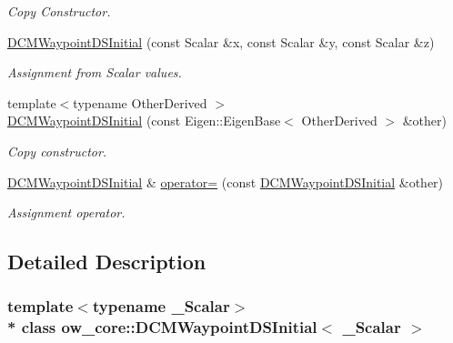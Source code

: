 \begin{DoxyCompactItemize}
\begin{DoxyCompactList}\small\item\em Copy Constructor. \end{DoxyCompactList}\item 
\hyperlink{classow__core_1_1DCMWaypointDSInitial_a5b2f311322420a5dd4dbcc60a7212f16}{D\+C\+M\+Waypoint\+D\+S\+Initial} (const Scalar \&x, const Scalar \&y, const Scalar \&z)\hypertarget{classow__core_1_1DCMWaypointDSInitial_a5b2f311322420a5dd4dbcc60a7212f16}{}\label{classow__core_1_1DCMWaypointDSInitial_a5b2f311322420a5dd4dbcc60a7212f16}

\begin{DoxyCompactList}\small\item\em Assignment from Scalar values. \end{DoxyCompactList}\item 
{\footnotesize template$<$typename Other\+Derived $>$ }\\\hyperlink{classow__core_1_1DCMWaypointDSInitial_a6097d0297b5a6a36bf34e053fc32567a}{D\+C\+M\+Waypoint\+D\+S\+Initial} (const Eigen\+::\+Eigen\+Base$<$ Other\+Derived $>$ \&other)
\begin{DoxyCompactList}\small\item\em Copy constructor. \end{DoxyCompactList}\item 
\hyperlink{classow__core_1_1DCMWaypointDSInitial}{D\+C\+M\+Waypoint\+D\+S\+Initial} \& \hyperlink{classow__core_1_1DCMWaypointDSInitial_a0e5bd8204fdeecf0227e1033b44550b3}{operator=} (const \hyperlink{classow__core_1_1DCMWaypointDSInitial}{D\+C\+M\+Waypoint\+D\+S\+Initial} \&other)\hypertarget{classow__core_1_1DCMWaypointDSInitial_a0e5bd8204fdeecf0227e1033b44550b3}{}\label{classow__core_1_1DCMWaypointDSInitial_a0e5bd8204fdeecf0227e1033b44550b3}

\begin{DoxyCompactList}\small\item\em Assignment operator. \end{DoxyCompactList}\end{DoxyCompactItemize}


\subsection{Detailed Description}
\subsubsection*{template$<$typename \+\_\+\+Scalar$>$\\*
class ow\+\_\+core\+::\+D\+C\+M\+Waypoint\+D\+S\+Initial$<$ \+\_\+\+Scalar $>$}

